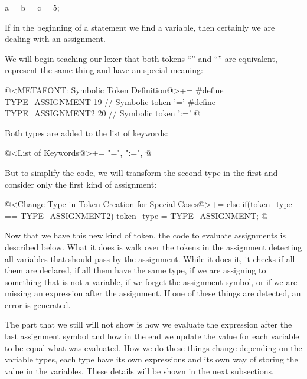 \alinhaverbatim
a = b = c = 5;
\alinhanormal

If in the beginning of a statement we find a variable, then certainly
we are dealing with an assignment.

We will begin teaching our lexer that both tokens ``\monoespaco{=}''
and ``\monoespaco{:=}'' are equivalent, represent the same thing and
have an special meaning:

\iniciocodigo
@<METAFONT: Symbolic Token Definition@>+=
#define TYPE_ASSIGNMENT            19 // Symbolic token '='
#define TYPE_ASSIGNMENT2           20 // Symbolic token ':='
@
\fimcodigo

Both types are added to the list of keywords:

\iniciocodigo
@<List of Keywords@>+=
"=", ":=",
@
\fimcodigo

But to simplify the code, we will transform the second type in the
first and consider only the first kind of assignment:

\iniciocodigo
@<Change Type in Token Creation for Special Cases@>+=
else if(token_type == TYPE_ASSIGNMENT2)
  token_type = TYPE_ASSIGNMENT;
@
\fimcodigo


Now that we have this new kind of token, the code to evaluate
assignments is described below. What it does is walk over the tokens
in the assignment detecting all variables that should pass by the
assignment. While it does it, it checks if all them are declared, if
all them have the same type, if we are assigning to something that is
not a variable, if we forget the assignment symbol, or if we are
missing an expression after the assignment. If one of these things are
detected, an error is generated.

The part that we still will not show is how we evaluate the expression
after the last assignment symbol and how in the end we update the
value for each variable to be equal what was evaluated. How we do
these things change depending on the variable types, each type have
its own expressions and its own way of storing the value in the
variables. These details will be shown in the next subsections.

